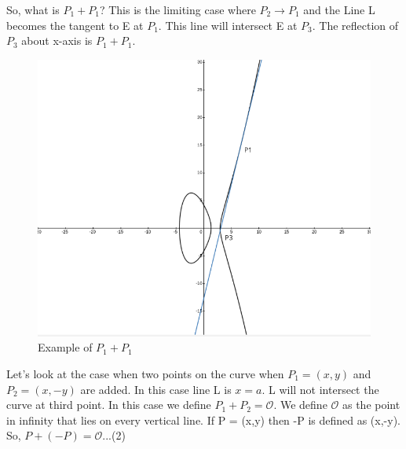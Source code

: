 \documentclass[12pt,a4paper]{report}
\begin{document}
\cleardoublepage
So, what is $P_1+P_1$? This is the limiting case where $P_2 \to P_1$ and the Line L becomes the tangent to E at $P_1$. This line will intersect E at $P_3$. The reflection of $P_3$ about x-axis  is $P_1+P_1$.
\begin{figure}[h!]
\caption{Example of $P_1+P_1$}
\begin{center}
\includegraphics[scale=0.3]{3}
\end{center}
\end{figure}
Let's look at the case when two points on the curve when $P_1=(x,y)$ and $P_2=(x,-y)$ are added. In this case line L is $x=a$. L will not intersect the curve at third point. In this case we define 
$ P_1+P_2= \mathscr{O} $. We define $\mathscr{O}$  as the point in infinity that lies on every vertical line. 
If P = (x,y) then -P is defined as (x,-y). So, $P+(-P)=\mathscr{O}$...(2)
\end{document}
